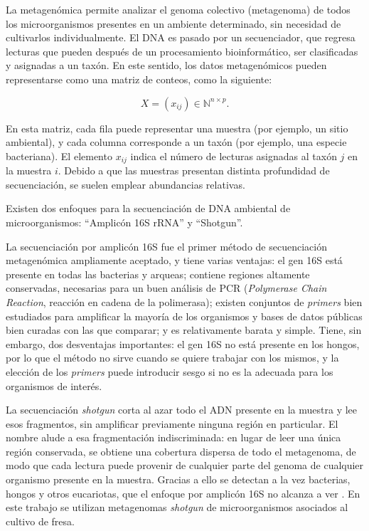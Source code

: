 La metagenómica permite analizar el genoma colectivo (metagenoma) de todos los microorganismos presentes en un ambiente determinado, 
sin necesidad de cultivarlos individualmente. El DNA es pasado por un secuenciador, que regresa lecturas que pueden después
de un procesamiento bioinformático, ser clasificadas y asignadas a un taxón. En este sentido, 
los datos metagenómicos pueden representarse como una matriz de conteos, como la siguiente:

\begin{equation}
X=(x_{ij}) \in \mathbb{N}^{n \times p}.
\label{eq:matriz-conteos}
\end{equation} 

En esta matriz, cada fila puede representar una muestra (por ejemplo, 
un sitio ambiental), y cada columna corresponde a un taxón (por ejemplo, una especie bacteriana). 
El elemento $x_{ij}$ indica el número de lecturas asignadas al taxón $j$ en la muestra $i$. 
Debido a que las muestras presentan distinta profundidad de secuenciación, 
se suelen emplear abundancias relativas.

Existen dos enfoques para la secuenciación de DNA ambiental de microorganismos:
``Amplicón 16S rRNA'' y ``Shotgun''.

La secuenciación por amplicón 16S fue el primer método de secuenciación metagenómica ampliamente
aceptado, y tiene varias ventajas: el gen 16S está presente en todas las bacterias y arqueas;
contiene regiones altamente conservadas, necesarias para un buen análisis de PCR (\emph{Polymerase
Chain Reaction}, reacción en cadena de la polimerasa); existen conjuntos de \emph{primers} bien
estudiados para amplificar la mayoría de los organismos y bases de datos públicas bien curadas con
las que comparar; y es relativamente barata y simple. Tiene, sin embargo, dos desventajas
importantes: el gen 16S no está presente en los hongos, por lo que el método no sirve cuando se
quiere trabajar con los mismos, y la elección de los \emph{primers} puede introducir sesgo si no es la
adecuada para los organismos de interés.

La secuenciación \emph{shotgun} corta al azar todo el ADN presente en la muestra y lee esos
fragmentos, sin amplificar previamente ninguna región en particular. El nombre alude a esa
fragmentación indiscriminada: en lugar de leer una única región conservada, se obtiene una cobertura
dispersa de todo el metagenoma, de modo que cada lectura puede provenir de cualquier parte del genoma
de cualquier organismo presente en la muestra. Gracias a ello se detectan a la vez bacterias, hongos
y otros eucariotas, que el enfoque por amplicón 16S no alcanza a ver
\citep{ranjan2016shotgun, hall201816s}. En este trabajo se utilizan metagenomas \emph{shotgun} de
microorganismos asociados al cultivo de fresa.

